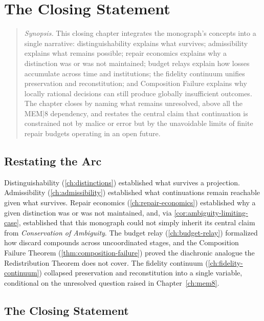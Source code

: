 \chapter{The Closing Statement}
\label{ch:synthesis}

\begin{quotation}
\noindent\textit{Synopsis.} This closing chapter integrates the
monograph's concepts into a single narrative: distinguishability explains
what survives; admissibility explains what remains possible; repair
economics explains why a distinction was or was not maintained; budget
relays explain how losses accumulate across time and institutions; the
fidelity continuum unifies preservation and reconstitution; and Composition
Failure explains why locally rational decisions can still produce globally
insufficient outcomes. The chapter closes by naming what remains
unresolved, above all the MEM|8 dependency, and restates the central claim
that continuation is constrained not by malice or error but by the
unavoidable limits of finite repair budgets operating in an open future.
\end{quotation}


\section{Restating the Arc}

Distinguishability (\cref{ch:distinctions}) established what survives
a projection. Admissibility (\cref{ch:admissibility}) established what
continuations remain reachable given what survives. Repair economics
(\cref{ch:repair-economics}) established why a given distinction was
or was not maintained, and, via \cref{cor:ambiguity-limiting-case},
established that this monograph could not simply inherit its central
claim from \emph{Conservation of Ambiguity}. The budget relay
(\cref{ch:budget-relay}) formalized how discard compounds across
uncoordinated stages, and the Composition Failure Theorem
(\cref{thm:composition-failure}) proved the diachronic analogue the
Redistribution Theorem does not cover. The fidelity continuum
(\cref{ch:fidelity-continuum}) collapsed preservation and
reconstitution into a single variable, conditional on the unresolved
question raised in Chapter~\ref{ch:mem8}.

\section{The Closing Statement}

